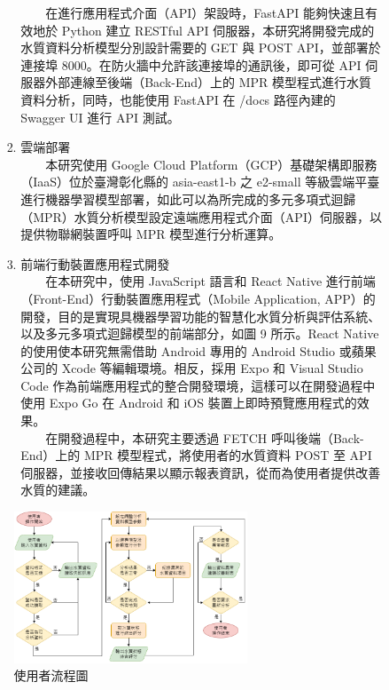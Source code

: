 \documentclass[12pt,a4paper]{article}
\begin{document}
\begin{enumerate}
\begin{enumerate}[label=\arabic*.]
\begin{enumerate}[label=2-2-\arabic*.]
\begin{enumerate}[label=\Alph*.]
                　　在進行應用程式介面（API）架設時，FastAPI 能夠快速且有效地於 Python 建立 RESTful API 伺服器，本研究將開發完成的水質資料分析模型分別設計需要的 GET 與 POST API，並部署於連接埠 8000。在防火牆中允許該連接埠的通訊後，即可從 API 伺服器外部連線至後端（Back-End）上的 MPR 模型程式進行水質資料分析，同時，也能使用 FastAPI 在 /docs 路徑內建的 Swagger UI 進行 API 測試。
                \item 雲端部署\\
                　　本研究使用 Google Cloud Platform（GCP）基礎架構即服務（IaaS）位於臺灣彰化縣的 asia-east1-b 之 e2-small 等級雲端平臺進行機器學習模型部署，如此可以為所完成的多元多項式迴歸（MPR）水質分析模型設定遠端應用程式介面（API）伺服器，以提供物聯網裝置呼叫 MPR 模型進行分析運算。
                \item 前端行動裝置應用程式開發\\
                　　在本研究中，使用 JavaScript 語言和 React Native 進行前端（Front-End）行動裝置應用程式（Mobile Application, APP）的開發，目的是實現具機器學習功能的智慧化水質分析與評估系統、以及多元多項式迴歸模型的前端部分，如圖 9 所示。React Native 的使用使本研究無需借助 Android 專用的 Android Studio 或蘋果公司的 Xcode 等編輯環境。相反，採用 Expo 和 Visual Studio Code 作為前端應用程式的整合開發環境，這樣可以在開發過程中使用 Expo Go 在 Android 和 iOS 裝置上即時預覽應用程式的效果。\\
                　　在開發過程中，本研究主要透過 FETCH 呼叫後端（Back-End）上的 MPR 模型程式，將使用者的水質資料 POST 至 API 伺服器，並接收回傳結果以顯示報表資訊，從而為使用者提供改善水質的建議。
            \end{enumerate}
    \end{enumerate}
    \begin{figure}[H]
        \centering
        \includegraphics[width=0.7\textwidth]{resources/image/使用者流程圖.png}
        \caption{使用者流程圖}
        \label{fig:user_flow}
    \end{figure}

\end{enumerate}
\end{enumerate}
\end{document}
